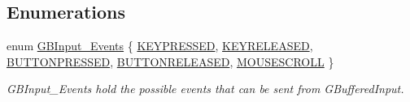\subsection*{Enumerations}
\begin{DoxyCompactItemize}
\item 
enum \hyperlink{namespace_g_w_1_1_c_o_r_e_ad9b7ad6dcc306c2d2029ad1981f5dbe2}{G\+B\+Input\+\_\+\+Events} \{ \newline
\hyperlink{namespace_g_w_1_1_c_o_r_e_ad9b7ad6dcc306c2d2029ad1981f5dbe2abf46538d2576fa9163bb7e2d8810d87d}{K\+E\+Y\+P\+R\+E\+S\+S\+ED}, 
\hyperlink{namespace_g_w_1_1_c_o_r_e_ad9b7ad6dcc306c2d2029ad1981f5dbe2ab848c4cec6f9e7274eac0eb89d89f062}{K\+E\+Y\+R\+E\+L\+E\+A\+S\+ED}, 
\hyperlink{namespace_g_w_1_1_c_o_r_e_ad9b7ad6dcc306c2d2029ad1981f5dbe2a8e6703f82c613fcc1f0f2981de982b1f}{B\+U\+T\+T\+O\+N\+P\+R\+E\+S\+S\+ED}, 
\hyperlink{namespace_g_w_1_1_c_o_r_e_ad9b7ad6dcc306c2d2029ad1981f5dbe2a208983c77eddfbabbed69b21e5e5172c}{B\+U\+T\+T\+O\+N\+R\+E\+L\+E\+A\+S\+ED}, 
\newline
\hyperlink{namespace_g_w_1_1_c_o_r_e_ad9b7ad6dcc306c2d2029ad1981f5dbe2a21a367509183a6c218bcfe776e107865}{M\+O\+U\+S\+E\+S\+C\+R\+O\+LL}
 \}\begin{DoxyCompactList}\small\item\em G\+B\+Input\+\_\+\+Events hold the possible events that can be sent from G\+Buffered\+Input. \end{DoxyCompactList}
\end{DoxyCompactItemize}
